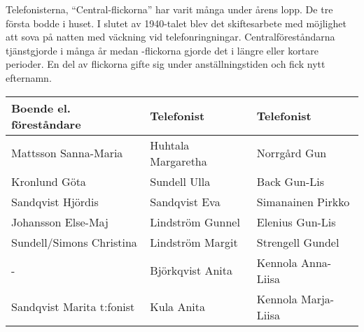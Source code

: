 Telefonisterna, ``Central-flickorna'' har varit många under årens lopp. De tre första bodde i huset. I slutet av 1940-talet blev det skiftesarbete med möjlighet att sova på natten med väckning vid telefonringningar. Centralföreståndarna tjänstgjorde i många år medan -flickorna gjorde det i längre eller kortare perioder. En del av flickorna gifte sig under anställningstiden och fick nytt efternamn.

\begin{center}
  \begin{tabular}{l l l}
    \hline
    Boende el. föreståndare & Telefonist & Telefonist\\ \hline
    Mattsson Sanna-Maria & Huhtala Margaretha & Norrgård Gun \\
    Kronlund Göta & Sundell Ulla & Back Gun-Lis \\
    Sandqvist Hjördis & Sandqvist Eva & Simanainen Pirkko \\
    Johansson Else-Maj & Lindström Gunnel & Elenius Gun-Lis \\
    Sundell/Simons Christina & Lindström Margit & Strengell Gundel \\
    - & Björkqvist Anita & Kennola Anna-Liisa \\
    Sandqvist Marita t:fonist & Kula Anita & Kennola Marja-Liisa\\ \hline
  \end{tabular}
\end{center}
